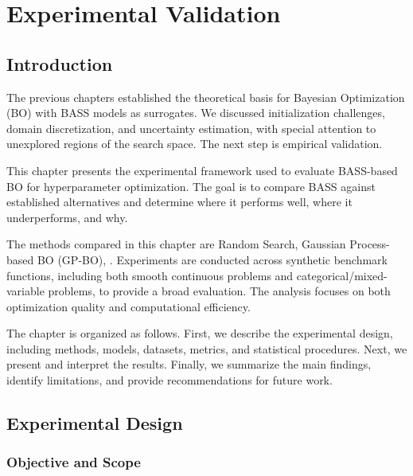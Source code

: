 \chapter{Experimental Validation}

\section{Introduction}

The previous chapters established the theoretical basis for Bayesian Optimization (BO) with BASS models as surrogates. We discussed initialization challenges, domain discretization, and uncertainty estimation, with special attention to unexplored regions of the search space. The next step is empirical validation.

This chapter presents the experimental framework used to evaluate BASS-based BO for hyperparameter optimization. The goal is to compare BASS against established alternatives and determine where it performs well, where it underperforms, and why. 

The methods compared in this chapter are Random Search, Gaussian Process-based BO (GP-BO), . Experiments are conducted across synthetic benchmark functions, including both smooth continuous problems and categorical/mixed-variable problems, to provide a broad evaluation. The analysis focuses on both optimization quality and computational efficiency.

The chapter is organized as follows. First, we describe the experimental design, including methods, models, datasets, metrics, and statistical procedures. Next, we present and interpret the results. Finally, we summarize the main findings, identify limitations, and provide recommendations for future work.

\section{Experimental Design}

\subsection{Objective and Scope}

